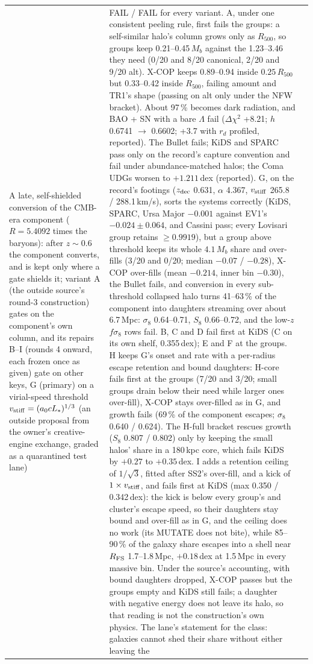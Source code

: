 \documentclass[10pt]{article}
\begin{document}
\begin{longtable}{@{}p{4.4cm}p{8.6cm}p{2.8cm}@{}}
A late, self-shielded conversion of the CMB-era component ($R=5.4092$ times the baryons): after $z\sim0.6$ the component converts, and is kept only where a gate shields it; variant A (the outside source's round-3 construction) gates on the component's own column, and its repairs B--I (rounds 4 onward, each frozen once as given) gate on other keys, G (primary) on a virial-speed threshold $v_{\rm stiff}=(a_0cL_*)^{1/3}$ (an outside proposal from the owner's creative-engine exchange, graded as a quarantined test lane) & FAIL / FAIL for every variant. A, under one consistent peeling rule, first fails the groups: a self-similar halo's column grows only as $R_{500}$, so groups keep 0.21--0.45\,$M_b$ against the 1.23--3.46 they need (0/20 and 8/20 canonical, 2/20 and 9/20 alt). X-COP keeps 0.89--0.94 inside $0.25\,R_{500}$ but 0.33--0.42 inside $R_{500}$, failing amount and TR1's shape (passing on alt only under the NFW bracket). About 97\,\% becomes dark radiation, and BAO + SN with a bare $\Lambda$ fail ($\Delta\chi^2$ +8.21; $h$ 0.6741 $\to$ 0.6602; +3.7 with $r_d$ profiled, reported). The Bullet fails; KiDS and SPARC pass only on the record's capture convention and fail under abundance-matched halos; the Coma UDGs worsen to $+1.211$\,dex (reported). G, on the record's footings ($z_{\rm dec}$ 0.631, $\alpha$ 4.367, $v_{\rm stiff}$ 265.8 / 288.1\,km/s), sorts the systems correctly (KiDS, SPARC, Ursa Major $-0.001$ against EV1's $-0.024\pm0.064$, and Cassini pass; every Lovisari group retains $\ge0.9919$), but a group above threshold keeps its whole $4.1\,M_b$ share and over-fills (3/20 and 0/20; median $-0.07$ / $-0.28$), X-COP over-fills (mean $-0.214$, inner bin $-0.30$), the Bullet fails, and conversion in every sub-threshold collapsed halo turns 41--63\,\% of the component into daughters streaming over about 6.7\,Mpc: $\sigma_8$ 0.64--0.71, $S_8$ 0.66--0.72, and the low-$z$ $f\sigma_8$ rows fail. B, C and D fail first at KiDS (C on its own shelf, 0.355\,dex); E and F at the groups. H keeps G's onset and rate with a per-radius escape retention and bound daughters: H-core fails first at the groups (7/20 and 3/20; small groups drain below their need while larger ones over-fill), X-COP stays over-filled as in G, and growth fails (69\,\% of the component escapes; $\sigma_8$ 0.640 / 0.624). The H-full bracket rescues growth ($S_8$ 0.807 / 0.802) only by keeping the small halos' share in a 180\,kpc core, which fails KiDS by $+0.27$ to $+0.35$\,dex. I adds a retention ceiling of $1/\sqrt3$, fitted after SS2's over-fill, and a kick of $1\times v_{\rm stiff}$, and fails first at KiDS (max 0.350 / 0.342\,dex): the kick is below every group's and cluster's escape speed, so their daughters stay bound and over-fill as in G, and the ceiling does no work (its MUTATE does not bite), while 85--90\,\% of the galaxy share escapes into a shell near $R_{\rm FS}$ 1.7--1.8\,Mpc, $+0.18$\,dex at 1.5\,Mpc in every massive bin. Under the source's accounting, with bound daughters dropped, X-COP passes but the groups empty and KiDS still fails; a daughter with negative energy does not leave its halo, so that reading is not the construction's own physics. The lane's statement for the class: galaxies cannot shed their share without either leaving the 
\end{longtable}
\end{document}
